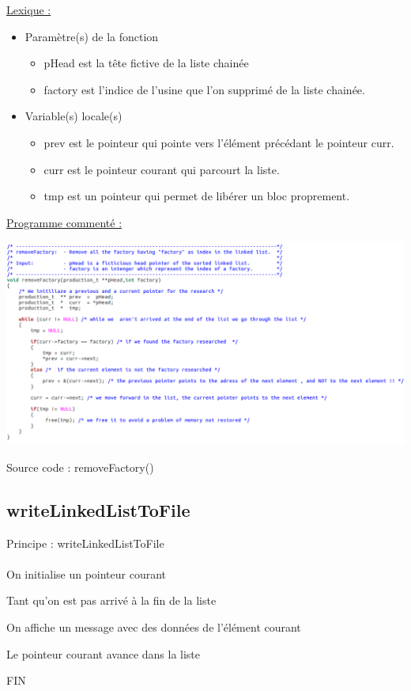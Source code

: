 \documentclass[a4paper]{article}
\newcommand\tab[1][1cm]{\hspace*{#1}}
\begin{document}
\underline{Lexique :}
\begin{itemize}
\item Paramètre(s) de la fonction  
\begin{itemize}
\item pHead est la tête fictive de la liste chainée
\item factory est l'indice de l'usine que l'on supprimé de la liste chainée.
\end{itemize}
\item Variable(s) locale(s)
\begin{itemize}
\item prev est le pointeur qui pointe vers l'élément précédant le pointeur curr.
\item curr est le pointeur courant qui parcourt la liste.
\item tmp est un pointeur qui permet de libérer un bloc proprement.
\end{itemize}
\end{itemize}

\underline{Programme commenté :}
\begin{center}
\includegraphics[scale=0.39]{removeFactory.png}

Source code : removeFactory()
\end{center}

\subsection{writeLinkedListToFile}
\begin{algorithm}
Principe : writeLinkedListToFile
\\
\\
\tab On initialise un pointeur courant

\tab Tant qu'on est pas arrivé à la fin de la liste 

\tab \tab On affiche un message avec des données de l'élément courant

\tab \tab Le pointeur courant avance dans la liste 

FIN
\end{algorithm}
\end{document}
